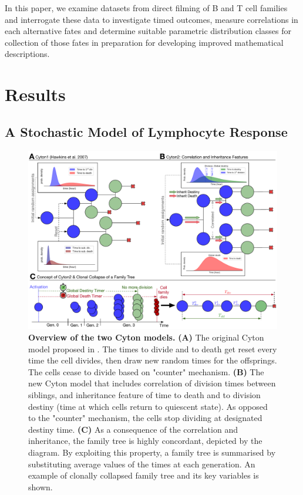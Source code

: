 \documentclass[11pt, a4paper]{article}
\begin{document}
In this paper, we examine datasets from direct filming of B and T cell families and interrogate these data to investigate timed outcomes, measure correlations in each alternative fates and determine suitable parametric distribution classes for collection of those fates in preparation for developing improved mathematical descriptions.

\nolinenumbers
\section{Results}
\subsection{A Stochastic Model of Lymphocyte Response}
\label{sec:model_definition}
\begin{figure}[t]
    \centering
    \includegraphics[scale=0.5]{figs/fig1.pdf}
    \caption{\textbf{Overview of the two Cyton models.} \textbf{(A)} The original Cyton model proposed in \cite{Hawkins.2007}. The times to divide and to death get reset every time the cell divides, then draw new random times for the offsprings. The cells cease to divide based on "counter" mechanism. \textbf{(B)} The new Cyton model that includes correlation of division times between siblings, and inheritance feature of time to death and to division destiny (time at which cells return to quiescent state). As opposed to the "counter" mechanism, the cells stop dividing at designated destiny time. \textbf{(C)} As a consequence of the correlation and inheritance, the family tree is highly concordant, depicted by the diagram. By exploiting this property, a family tree is summarised by substituting average values of the times at each generation. An example of clonally collapsed family tree and its key variables is shown.}
    \label{fig:model}
\end{figure}
\end{document}
